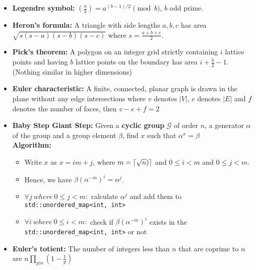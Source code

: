 \documentclass[15pt,a4paper]{article}
\DeclarePairedDelimiter{\ceil}{\lceil}{\rceil}
\begin{document}
\begin{landscape}

\begin{multicols*}{3}
    
\begin{itemize}
    \item \textbf{Legendre symbol:} $\left(\frac{a}{b}\right) = a^{(b-1)/2} \pmod{b}$, $b$ odd prime.
    \item \textbf{Heron's formula:} A triangle with side lengths
    $a,b,c$ has area $\sqrt{s(s-a)(s-b)(s-c)}$ where $s =
    \frac{a+b+c}{2}$.
    \item \textbf{Pick's theorem:} A polygon on an integer grid
    strictly containing $i$ lattice points and having $b$ lattice
    points on the boundary has area $i + \frac{b}{2} - 1$. (Nothing
    similar in higher dimensions)
    \item \textbf{Euler characteristic:} A finite, connected, planar graph is drawn in the plane without any edge intersections where $v$ denotes $|V|$, $e$ denotes $|E|$ and $f$ denotes the number of faces, then $v - e + f = 2$
    \item \textbf{Baby Step Giant Step:} Given a \textbf{cyclic group} $\mathcal{G}$ of order $n$, a generator $\alpha$ of the group and a group element $\beta$, find $x$ such that $\alpha^x = \beta$\\
        \textbf{Algorithm: }\begin{itemize}
            \item Write $x$ as $x = im + j$, where $m = \ceil{\sqrt{n})}$ and $0 \leq i < m$ and $0 \leq j < m$.
            \item Hence, we have $\beta(\alpha^{-m})^{i} = \alpha^j$.
            \item $\forall j\ where\ 0 \leq j < m:$ calculate $\alpha^j$ and add them to \verb!std::unordered_map<int, int>!
            \item $\forall i\ where\ 0 \leq i < m:$ check if $\beta(\alpha^{-m})^{i}$ exists in the \verb|std::unordered_map<int, int>| or not
        \end{itemize}
    \item \textbf{Euler's totient:} The number of integers less than
    $n$ that are coprime to $n$ are $n\prod_{p|n}\left(1 - \frac{1}{p}\right)$

\end{itemize}
\end{multicols*}
\end{landscape}
\end{document}
